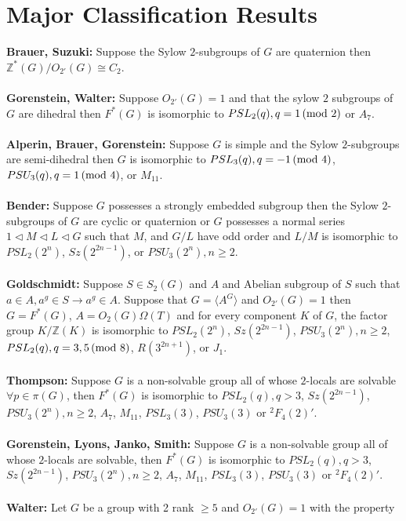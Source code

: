 \section{Major Classification Results}
{\bf Brauer, Suzuki:} Suppose the Sylow $2$-subgroups of $G$ are quaternion then
${\mathbb Z}^*(G)/O_{2'}(G) \cong C_2$.
\\
\\
{\bf Gorenstein, Walter:} Suppose $O_{2'}(G)=1$ and that the sylow $2$ subgroups of $G$ are
dihedral then $F^*(G)$ is isomorphic to $PSL_2(q), q=1 \thinspace \textnormal{(mod } 2 \textnormal{)}$ or $A_7$.
\\
\\
{\bf Alperin, Brauer, Gorenstein:} Suppose $G$ is simple and the Sylow 
$2$-subgroups are semi-dihedral then $G$ is isomorphic to 
$PSL_3(q), q= -1 \thinspace \textnormal{(mod } 4 \textnormal{)}$,
$PSU_3(q), q= 1 \thinspace \textnormal{(mod } 4 \textnormal{)}$,
or $M_{11}$.
\\
\\
{\bf Bender:} Suppose $G$ possesses a strongly embedded subgroup then the Sylow
$2$-subgroups of $G$ are cyclic or quaternion or $G$ possesses a normal series
$1 \lhd M \lhd L \lhd G$ such that $M$, and $G/L$ have odd order and
$L/M$ is isomorphic to 
$PSL_2(2^n)$, $Sz(2^{2n-1})$, or $PSU_3(2^n), n \ge 2$.
\\
\\
{\bf Goldschmidt:} Suppose $S \in S_2(G)$ and $A$ and Abelian subgroup of $S$
such that $a \in A, a^g \in S \rightarrow a^g \in A$.  Suppose that $G= \langle A^G \rangle $ and
$O_{2'}(G)=1$ then $G=F^*(G)$, $A=O_2(G) \Omega(T)$ and for every component
$K$ of $G$, the factor group $K/{\mathbb Z}(K)$ is isomorphic to
$PSL_2(2^n)$, $Sz(2^{2n-1})$, $PSU_3(2^n), n \ge 2$, $PSL_2(q), q = 3, 5 \thinspace \textnormal{(mod } 8 \textnormal{)}$,
$R(3^{2n+1})$, or $J_1$.
\\
\\
{\bf Thompson:} Suppose $G$ is a non-solvable group all of whose
$2$-locals are solvable $\forall p \in \pi(G)$, then $F^*(G)$ is isomorphic to
$PSL_2(q), q>3$, $Sz(2^{2n-1})$, $PSU_3(2^n), n \ge 2$, $A_7$, $M_{11}$, $PSL_3(3)$,
$PSU_3(3)$
or $^2F_4(2)'$.
\\
\\
{\bf Gorenstein, Lyons, Janko, Smith:} Suppose $G$ is a non-solvable group all of whose
$2$-locals are solvable, then $F^*(G)$ is isomorphic to
$PSL_2(q), q > 3$, $Sz(2^{2n-1})$, $PSU_3(2^n), n \ge 2$, $A_7$, $M_{11}$, $PSL_3(3)$,
$PSU_3(3)$ or $^2F_4(2)'$.
\\
\\
{\bf Walter:} Let $G$ be a group with 2 rank $\ge 5$ and $O_{2'}(G)=1$ with the property
